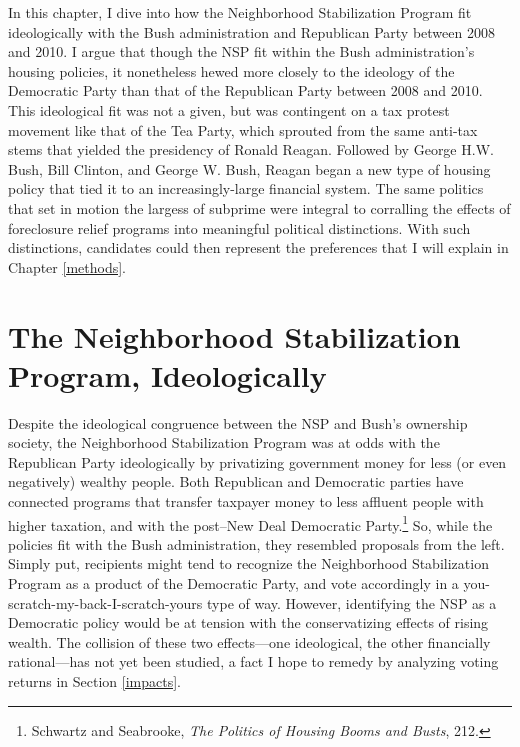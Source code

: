 \documentclass[12pt,oneside]{psthesis}
\begin{document}
In this chapter, I dive into how the Neighborhood Stabilization Program fit ideologically with the Bush administration and Republican Party between 2008 and 2010.
I argue that though the NSP fit within the Bush administration's housing policies, it nonetheless hewed more closely to the ideology of the Democratic Party than that of the Republican Party between 2008 and 2010.
This ideological fit was not a given, but was contingent on a tax protest movement like that of the Tea Party, which sprouted from the same anti-tax stems that yielded the presidency of Ronald Reagan.
Followed by George H.W. Bush, Bill Clinton, and George W. Bush, Reagan began a new type of housing policy that tied it to an increasingly-large financial system.
The same politics that set in motion the largess of subprime were integral to corralling the effects of foreclosure relief programs into meaningful political distinctions.
With such distinctions, candidates could then represent the preferences that I will explain in Chapter \ref{methods}.

\hypertarget{the-neighborhood-stabilization-program-ideologically}{%
\section{The Neighborhood Stabilization Program, Ideologically}\label{the-neighborhood-stabilization-program-ideologically}}

Despite the ideological congruence between the NSP and Bush's ownership society, the Neighborhood Stabilization Program was at odds with the Republican Party ideologically by privatizing government money for less (or even negatively) wealthy people.
Both Republican and Democratic parties have connected programs that transfer taxpayer money to less affluent people with higher taxation, and with the post--New Deal Democratic Party.\footnote{Schwartz and Seabrooke, \emph{The Politics of Housing Booms and Busts}, 212.}
So, while the policies fit with the Bush administration, they resembled proposals from the left.
Simply put, recipients might tend to recognize the Neighborhood Stabilization Program as a product of the Democratic Party, and vote accordingly in a you-scratch-my-back-I-scratch-yours type of way.
However, identifying the NSP as a Democratic policy would be at tension with the conservatizing effects of rising wealth.
The collision of these two effects---one ideological, the other financially rational---has not yet been studied, a fact I hope to remedy by analyzing voting returns in Section \ref{impacts}.
\end{document}
